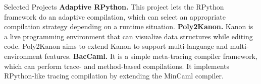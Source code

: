 \begin{rubric}{Selected Projects}
  \entry*[2021-] \textbf{Adaptive RPython.} This project lets the RPython framework do
  an adaptive compilation, which can select an appropriate compilation strategy
  depending on a runtime situation.
  \entry*[2020-] \textbf{Poly2Kanon.} Kanon is a live programming environment that can
  visualize data structures while editing code. Poly2Kanon aims to extend Kanon to
  support multi-language and multi-environment features.
  \entry*[2019-2020] \textbf{BacCaml.} It is a simple meta-tracing compiler framework,
  which can perform trace- and method-based compilations. It implements RPython-like
  tracing compilation by extending the MinCaml compiler.
\end{rubric}
